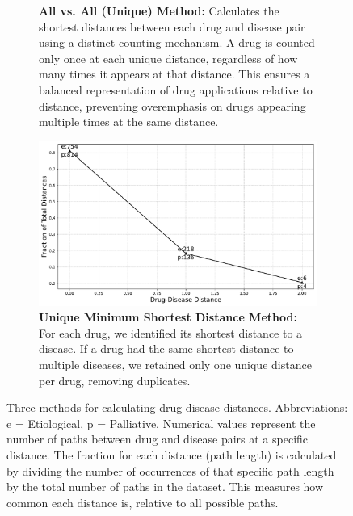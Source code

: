 \documentclass[journal,twoside,web]{ieeecolor}
\begin{document}
\begin{figure}[H]
\begin{subfigure}[H]{\linewidth}
   \caption{\textbf{All vs. All (Unique) Method:} 
   Calculates the shortest distances between each drug and disease pair using a distinct counting mechanism. A drug is counted only once at each unique distance, regardless of how many times it appears at that distance. This ensures a balanced representation of drug applications relative to distance, preventing overemphasis on drugs appearing multiple times at the same distance.}
   \label{fig:yildirim2}
\end{subfigure}
\begin{subfigure}[H]{\linewidth}
   \includegraphics[width=\linewidth]{Figures/Yildrim_unique_minimum_shortest_distance.pdf}
   \caption{\textbf{Unique Minimum Shortest Distance Method:} 
   For each drug, we identified its shortest distance to a disease. 
   If a drug had the same shortest distance to multiple diseases, we retained only one unique distance per drug, removing duplicates.
   }
   \label{fig:yildirim3}
\end{subfigure}
\caption{Three methods for calculating drug-disease distances.
Abbreviations: e = Etiological, p = Palliative. 
Numerical values represent the number of paths between drug and disease pairs at a specific distance. 
The fraction for each distance (path length) is calculated by dividing the number of occurrences of that specific path length by the total number of paths in the dataset.
This measures how common each distance is, relative to all possible paths.}
\label{fig:yildirim}
\end{figure}

\end{document}
